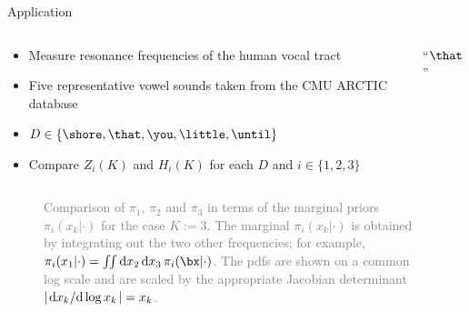\documentclass[10pt,xcolor={dvipsnames}]{beamer}
\newcommand{\pgffigure}[2]{%
\scalebox{#2}{}
}
\begin{document}


\begin{frame}[label=current]{Application}

\vspace{.5cm}
\onslide<+->

\begin{overprint}

\onslide<+->

\begin{columns}
\begin{column}{.5\textwidth}
\begin{itemize}
\widesep
\item Measure resonance frequencies of the human vocal tract
\item Five representative vowel sounds taken from the CMU ARCTIC database \cite{Kominek2004}
\item $D \in \{\shore, \that, \you, \little, \until\}$
\item Compare $Z_i(K)$ and $H_i(K)$ for each $D$ and $i \in \{1,2,3\}$
\end{itemize}
\end{column}
\begin{column}{.5\textwidth}
\centering ``$\that$'' \\
\vspace{.1cm}
\pgffigure{model-data.pgf}{.5}
\pgffigure{model-spectrum.pgf}{.5}
\end{column}
\end{columns}

\onslide<+->

\begin{figure}[t]
\pgffigure{priors.pgf}{.62}
\caption{%
\footnotesize
\justifying
\textcolor{gray}{%
Comparison of $\pi_1$, $\pi_2$ and $\pi_3$ in terms of the marginal priors $\pi_i(x_k|\cdot)$ for the case $K :=3 $.
The marginal $\pi_i(x_k|\cdot)$ is obtained by integrating out the two other frequencies; for example, $\pi_i(x_1|\cdot) = \iint \dd{x_2} \dd{x_3} \pi_i(\bx|\cdot)$.
The pdfs are shown on a common log scale and are scaled by the appropriate Jacobian determinant $\abs{\dv*{x_k}{\log{x_k}}} = x_k$.
\label{priors}
}
}
\end{figure}


\end{overprint}
\end{frame}
\end{document}
